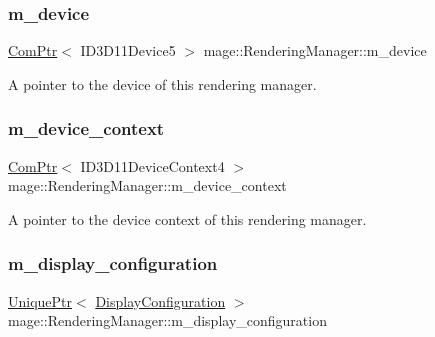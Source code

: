\subsubsection{\texorpdfstring{m\+\_\+device}{m\_device}}
{\footnotesize\ttfamily \hyperlink{namespacemage_ae74f374780900893caa5555d1031fd79}{Com\+Ptr}$<$ I\+D3\+D11\+Device5 $>$ mage\+::\+Rendering\+Manager\+::m\+\_\+device\hspace{0.3cm}{\ttfamily [private]}}

A pointer to the device of this rendering manager. \hypertarget{classmage_1_1_rendering_manager_a8838eae5c90bbdf5282655ac4f7af7fd}{}\label{classmage_1_1_rendering_manager_a8838eae5c90bbdf5282655ac4f7af7fd} 
\subsubsection{\texorpdfstring{m\+\_\+device\+\_\+context}{m\_device\_context}}
{\footnotesize\ttfamily \hyperlink{namespacemage_ae74f374780900893caa5555d1031fd79}{Com\+Ptr}$<$ I\+D3\+D11\+Device\+Context4 $>$ mage\+::\+Rendering\+Manager\+::m\+\_\+device\+\_\+context\hspace{0.3cm}{\ttfamily [private]}}

A pointer to the device context of this rendering manager. \hypertarget{classmage_1_1_rendering_manager_a23a8d0b6bccba3379eafcece28b28090}{}\label{classmage_1_1_rendering_manager_a23a8d0b6bccba3379eafcece28b28090} 
\subsubsection{\texorpdfstring{m\+\_\+display\+\_\+configuration}{m\_display\_configuration}}
{\footnotesize\ttfamily \hyperlink{namespacemage_a3316d7143a973e37adf1110f2e80ca31}{Unique\+Ptr}$<$ \hyperlink{structmage_1_1_display_configuration}{Display\+Configuration} $>$ mage\+::\+Rendering\+Manager\+::m\+\_\+display\+\_\+configuration\hspace{0.3cm}{\ttfamily [private]}}

